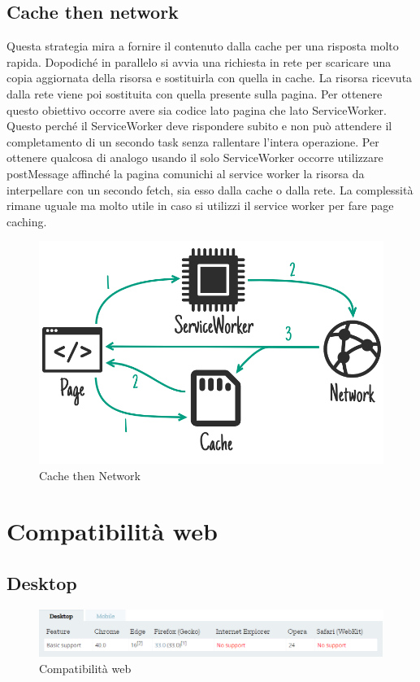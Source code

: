 \documentclass[11pt ,a4paper , twoside , openright ]{article}
\begin{document}
\subsection{Cache then network}
Questa strategia mira a fornire il contenuto dalla cache per una risposta molto rapida. Dopodiché in parallelo si avvia una richiesta in rete per scaricare una copia aggiornata della risorsa e sostituirla con quella in cache. La risorsa ricevuta dalla rete viene poi sostituita con quella presente sulla pagina.
Per ottenere questo obiettivo occorre avere sia codice lato pagina che lato ServiceWorker. Questo perché il ServiceWorker deve rispondere subito e non può attendere il completamento di un secondo task senza rallentare l’intera operazione.
Per ottenere qualcosa di analogo usando il solo ServiceWorker occorre utilizzare postMessage affinché la pagina comunichi al service worker la risorsa da interpellare con un secondo fetch, sia esso dalla cache o dalla rete. La complessità rimane uguale ma molto utile in caso si utilizzi il service worker per fare page caching.

\begin{figure}[h]
	\centering
	\includegraphics[width=1\linewidth]{Strategia6}
	\caption{Cache then Network}
	\label{fig: Cache then Network}
\end{figure}
\pagebreak

\section{Compatibilità web}
\subsection{Desktop}
\begin{figure}[h]
	\centering
	\includegraphics[width=1\linewidth]{CompWeb}
	\caption{Compatibilità web}
	\label{fig:Compatibilità web}
\end{figure}
\end{document}

